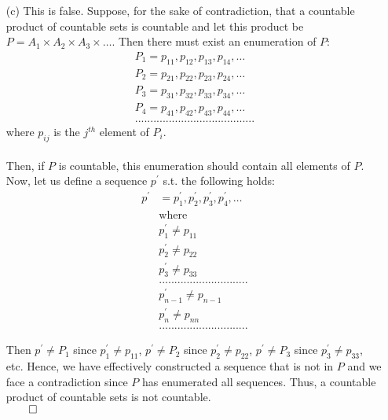 \documentclass[11pt]{article}
\begin{document}
\begin{itemize}
\begin{itemize}
            \item[(c)]
                This is false. Suppose, for the sake of contradiction, that a
                countable product of countable sets is countable and let this
                product be $P = A_1 \times A_2 \times A_3 \times \dots$. Then
                there must exist an enumeration of $P$:
                \begin{align*}
                    P_1 = p_{11}, p_{12}, p_{13}, p_{14}, \dots\\
                    P_2 = p_{21}, p_{22}, p_{23}, p_{24}, \dots\\
                    P_3 = p_{31}, p_{32}, p_{33}, p_{34}, \dots\\
                    P_4 = p_{41}, p_{42}, p_{43}, p_{44}, \dots\\
                    .......................................
                \end{align*}
                where $p_{ij}$ is the $j^{th}$ element of $P_i$.
                \\
                \\
                Then, if $P$ is countable, this enumeration should contain all
                elements of $P$.
                \\
                Now, let us define a sequence $p^\prime$ s.t. the following
                holds:
                \begin{align*}
                    p^\prime &= p^\prime_1, p^\prime_2, p^\prime_3, p^\prime_4, \dots\\
                             &\text{where}\\
                             & p^\prime_1 \neq p_{11}\\
                             & p^\prime_2 \neq p_{22}\\
                             & p^\prime_3 \neq p_{33}\\
                             & .............................\\
                             & p^\prime_{n - 1} \neq p_{n - 1}\\
                             & p^\prime_n \neq p_{nn}\\
                             & .............................
                \end{align*}
                
                Then $p^\prime \neq P_1$ since $p^\prime_1 \neq p_{11}$,
                $p^\prime \neq P_2$ since $p^\prime_2 \neq p_{22}$, $p^\prime
                \neq P_3$ since $p^\prime_3 \neq p_{33}$, etc.  Hence, we have
                effectively constructed a sequence that is not in $P$ and we
                face a contradiction since $P$ has enumerated all sequences.
                Thus, a countable product of countable sets is not countable.\\
                $\qed$
        \end{itemize}


\end{itemize}
\end{document}
